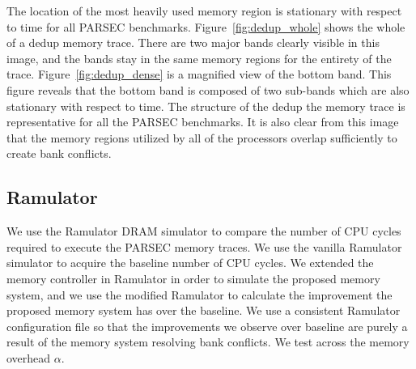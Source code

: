 The location of the most heavily used memory region is stationary with respect to time for all PARSEC benchmarks. Figure~\ref{fig:dedup_whole} shows the whole of a dedup memory trace. There are two major bands clearly visible in this image, and the bands stay in the same memory regions for the entirety of the trace. Figure~\ref{fig:dedup_dense} is a magnified view of the bottom band. This figure reveals that the bottom band is composed of two sub-bands which are also stationary with respect to time. The structure of the dedup the memory trace is representative for all the PARSEC benchmarks. It is also clear from this image that the memory regions utilized by all of the processors overlap sufficiently to create bank conflicts.

\subsection{Ramulator}

We use the Ramulator DRAM simulator to compare the number of CPU cycles required to execute the PARSEC memory traces. We use the vanilla Ramulator simulator to acquire the baseline number of CPU cycles. We extended the memory controller in Ramulator in order to simulate the proposed memory system, and we use the modified Ramulator to calculate the improvement the proposed memory system has over the baseline. We use a consistent Ramulator configuration file so that the improvements we observe over baseline are purely a result of the memory system resolving bank conflicts. We test across the memory overhead $\alpha$.

%
